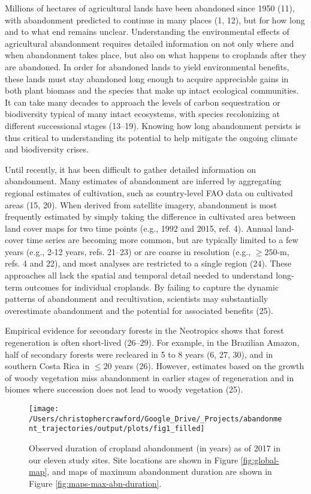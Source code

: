 \documentclass[9pt,twocolumn,twoside,lineno]{pnas-new}
\begin{document}
Millions of hectares of agricultural lands have been abandoned since 1950 (11), with abandonment predicted to continue in many places (1, 12), but for how long and to what end remains unclear.
Understanding the environmental effects of agricultural abandonment requires detailed information on not only where and when abandonment takes place, but also on what happens to croplands after they are abandoned.
In order for abandoned lands to yield environmental benefits, these lands must stay abandoned long enough to acquire appreciable gains in both plant biomass and the species that make up intact ecological communities.
It can take many decades to approach the levels of carbon sequestration or biodiversity typical of many intact ecosystems, with species recolonizing at different successional stages (13--19).
Knowing how long abandonment persists is thus critical to understanding its potential to help mitigate the ongoing climate and biodiversity crises.

Until recently, it has been difficult to gather detailed information on abandonment.
Many estimates of abandonment are inferred by aggregating regional estimates of cultivation, such as country-level FAO data on cultivated areas (15, 20).
When derived from satellite imagery, abandonment is most frequently estimated by simply taking the difference in cultivated area between land cover maps for two time points (e.g., 1992 and 2015, ref. 4).
Annual land-cover time series are becoming more common, but are typically limited to a few years (e.g., 2-12 years, refs. 21--23) or are coarse in resolution (e.g., \(\geq250\)-m, refs. 4 and 22), and most analyses are restricted to a single region (24).
These approaches all lack the spatial and temporal detail needed to understand long-term outcomes for individual croplands.
By failing to capture the dynamic patterns of abandonment and recultivation, scientists may substantially overestimate abandonment and the potential for associated benefits (25).

Empirical evidence for secondary forests in the Neotropics shows that forest regeneration is often short-lived (26--29).
For example, in the Brazilian Amazon, half of secondary forests were recleared in 5 to 8 years (6, 27, 30), and in southern Costa Rica in \(\leq20\) years (26).
However, estimates based on the growth of woody vegetation miss abandonment in earlier stages of regeneration and in biomes where succession does not lead to woody vegetation (25).



\begin{figure*}
\texttt{[image: /Users/christophercrawford/Google\_Drive/\_Projects/abandonment\_trajectories/output/plots/fig1\_filled]} \caption{Observed duration of cropland abandonment (in years) as of 2017 in our eleven study sites. Site locations are shown in Figure \ref{fig:global-map}, and maps of maximum abandonment duration are shown in Figure \ref{fig:maps-max-abn-duration}.}\label{fig:maps-abn-duration}
\end{figure*}
\end{document}
